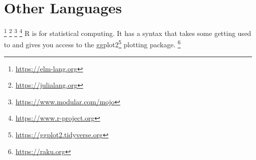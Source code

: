 \section{Other Languages}

\begin{itemize}
  \footnote{\url{https://elm-lang.org}}
  \footnote{\url{https://julialang.org}}
  \footnote{\url{https://www.modular.com/mojo}}
  \footnote{\url{https://www.r-project.org}} R is for statistical computing. It has a syntax that takes some getting used to and gives you access to the ggplot2\footnote{\url{https://ggplot2.tidyverse.org}} plotting package.
  \footnote{\url{https://raku.org}}
\end{itemize}
